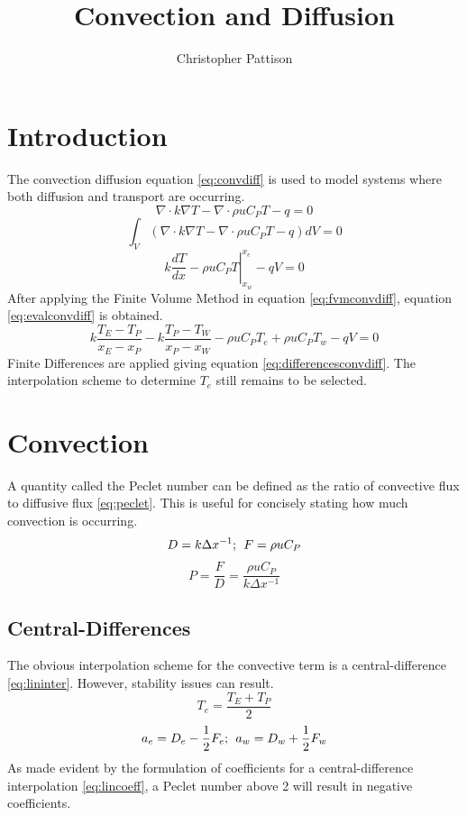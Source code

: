 \documentclass[12pt,twocolumn]{article}
\title{\vspace{-2.5em}Convection and Diffusion}
\author{Christopher Pattison}
\date{}
\begin{document}
\maketitle
\section*{Introduction}
The convection diffusion equation \eqref{eq:convdiff} is used to model systems where both diffusion and transport are occurring. 
\begin{equation}\label{eq:convdiff}\nabla\cdot k \nabla T - \nabla\cdot\rho u C_P T -q = 0\end{equation}
\begin{equation}\label{eq:fvmconvdiff}\int_V(\nabla\cdot k \nabla T - \nabla\cdot\rho u C_P T - q)dV = 0\end{equation}
\begin{equation}\label{eq:evalconvdiff}\left. k \frac{dT}{dx} - \rho u C_P T \right\rvert^{x_e}_{x_w}  - qV= 0\end{equation}
After applying the Finite Volume Method in equation \eqref{eq:fvmconvdiff}, equation \eqref{eq:evalconvdiff} is obtained.
\begin{equation}\label{eq:differencesconvdiff}k\frac{T_E-T_P}{x_E-x_P} - k\frac{T_P-T_W}{x_P-x_W}-\rho u C_P T_e + \rho u C_P T_w - qV= 0\end{equation}
Finite Differences are applied giving equation \eqref{eq:differencesconvdiff}.
The interpolation scheme to determine $T_e$ still remains to be selected.

\section*{Convection}
A quantity called the Peclet number can be defined as the ratio of convective flux to diffusive flux \eqref{eq:peclet}.
This is useful for concisely stating how much convection is occurring.
\begin{equation}D = k\Delta x^{-1};\hspace{1ex} F= \rho u C_P\end{equation}
\begin{equation}\label{eq:peclet}P = \frac{F}{D} = \frac{\rho u C_P}{k\Delta x^{-1}}\end{equation}
\subsection*{Central-Differences}
The obvious interpolation scheme for the convective term is a central-difference \eqref{eq:lininter}. However, stability issues can result.
\begin{equation}\label{eq:lininter}T_e = \frac{T_E+T_P}{2} \end{equation}
\begin{equation}\label{eq:lincoeff}a_e = D_e - \frac 12 F_e;\hspace{1ex}a_w = D_w + \frac 12 F_w \end{equation}
As made evident by the formulation of coefficients for a central-difference interpolation \eqref{eq:lincoeff}, a Peclet number above 2 will result in negative coefficients.
\end{document}
